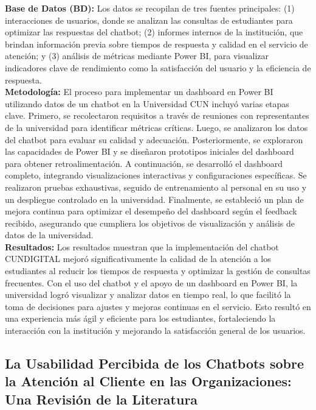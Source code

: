\documentclass[10pt,a4paper]{article}
\begin{document}
\textbf{Base de Datos (BD):} Los datos se recopilan de tres fuentes principales: (1) interacciones de usuarios, donde se analizan las consultas de estudiantes para optimizar las respuestas del chatbot; (2) informes internos de la institución, que brindan información previa sobre tiempos de respuesta y calidad en el servicio de atención; y (3) análisis de métricas mediante Power BI, para visualizar indicadores clave de rendimiento como la satisfacción del usuario y la eficiencia de respuesta. \\

\textbf{Metodología:} El proceso para implementar un dashboard en Power BI utilizando datos de un chatbot en la Universidad CUN incluyó varias etapas clave. Primero, se recolectaron requisitos a través de reuniones con representantes de la universidad para identificar métricas críticas. Luego, se analizaron los datos del chatbot para evaluar su calidad y adecuación. Posteriormente, se exploraron las capacidades de Power BI y se diseñaron prototipos iniciales del dashboard para obtener retroalimentación. A continuación, se desarrolló el dashboard completo, integrando visualizaciones interactivas y configuraciones específicas. Se realizaron pruebas exhaustivas, seguido de entrenamiento al personal en su uso y un despliegue controlado en la universidad. Finalmente, se estableció un plan de mejora continua para optimizar el desempeño del dashboard según el feedback recibido, asegurando que cumpliera los objetivos de visualización y análisis de datos de la universidad. \\

\textbf{Resultados:} Los resultados muestran que la implementación del chatbot CUNDIGITAL mejoró significativamente la calidad de la atención a los estudiantes al reducir los tiempos de respuesta y optimizar la gestión de consultas frecuentes. Con el uso del chatbot y el apoyo de un dashboard en Power BI, la universidad logró visualizar y analizar datos en tiempo real, lo que facilitó la toma de decisiones para ajustes y mejoras continuas en el servicio. Esto resultó en una experiencia más ágil y eficiente para los estudiantes, fortaleciendo la interacción con la institución y mejorando la satisfacción general de los usuarios. \\


\subsection{La Usabilidad Percibida de los Chatbots sobre la Atención al Cliente en las Organizaciones: Una Revisión de la Literatura}
\end{document}
